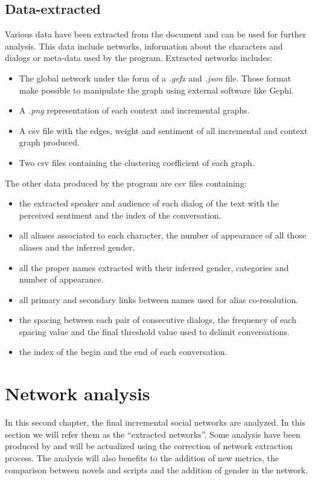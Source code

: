 \documentclass[a4paper, 12pt]{report}
\begin{document}
\newpage
\section{Data-extracted}
Various data have been extracted from the document and can be used for further analysis. This data include networks, information about the characters and dialogs or meta-data used by the program.
Extracted networks includes:
\begin{itemize}
\item The global network under the form of a \textit{.gefx} and \textit{.json} file. Those format make possible to manipulate the graph using external software like Gephi.
\item A \textit{.png} representation of each context and incremental graphs.
\item A csv file with the edges, weight and sentiment of all incremental and context graph produced.
\item Two csv files containing the clustering coefficient of each graph.
\end{itemize}

The other data produced by the program are csv files containing:
\begin{itemize}
\item the extracted speaker and audience of each dialog of the text with the perceived sentiment and the index of the conversation.
\item all aliases associated to each character, the number of appearance of all those aliases and the inferred gender.
\item all the proper names extracted with their inferred gender, categories and number of appearance.
\item all primary and secondary links between names used for alias co-resolution.
\item the spacing between each pair of consecutive dialogs, the frequency of each spacing value and the final threshold value used to delimit conversations.
\item the index of the begin and the end of each conversation.
\end{itemize}









\chapter{Network analysis}
In this second chapter, the final incremental social networks are analyzed. In this section we will refer them as the ``extracted networks''. 
Some analysis have been produced by \cite{original} and will be actualized using the correction of network extraction process. 
The analysis will also benefits to the addition of new metrics, the comparison between novels and scripts and the addition of gender in the network.
\end{document}
